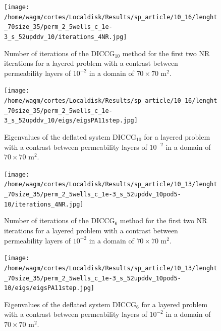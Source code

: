 \documentclass[12pt]{article}
\begin{document}
\begin{figure}[!h]
\centering
\begin{minipage}{.4\textwidth}
\vspace{-0.4cm}
\hspace{-1cm}
\texttt{[image: /home/wagm/cortes/Localdisk/Results/sp\_article/10\_16/lenght\_70size\_35/perm\_2\_5wells\_c\_1e-3\_s\_52upddv\_10/iterations\_4NR.jpg]}
\vspace{-1.3cm}
\caption{Number of iterations of the DICCG$_{10}$ method for the first two NR iterations for a layered problem with a contrast between permeability layers of $10^{-2}$ in a domain of $70 \times 70$ m$^2$.}
\label{fig:NR_D10_2}
\end{minipage}%
\hspace{15mm}
\begin{minipage}{.4\textwidth}
 \centering
\texttt{[image: /home/wagm/cortes/Localdisk/Results/sp\_article/10\_16/lenght\_70size\_35/perm\_2\_5wells\_c\_1e-3\_s\_52upddv\_10/eigs/eigsPA11step.jpg]}
\caption{Eigenvalues of the deflated system DICCG$_{10}$ for a layered problem with a contrast between permeability layers of $10^{-2}$ in a domain of $70 \times 70$ m$^2$.}
\label{fig:eigs_PA10_2}
\end{minipage}
\end{figure}


\begin{figure}[!h]
\centering
\begin{minipage}{.4\textwidth}
\vspace{-0.4cm}
\hspace{-1cm}
\texttt{[image: /home/wagm/cortes/Localdisk/Results/sp\_article/10\_13/lenght\_70size\_35/perm\_2\_5wells\_c\_1e-3\_s\_52upddv\_10pod5-10/iterations\_4NR.jpg]}
\vspace{-1.3cm}
\caption{Number of iterations of the DICCG$_6$ method for the first two NR iterations for a layered problem with a contrast between permeability layers of $10^{-2}$ in a domain of $70 \times 70$ m$^2$.}
\label{fig:NR_D6_2}
\end{minipage}%
\hspace{15mm}
\begin{minipage}{.4\textwidth}
 \centering
\texttt{[image: /home/wagm/cortes/Localdisk/Results/sp\_article/10\_13/lenght\_70size\_35/perm\_2\_5wells\_c\_1e-3\_s\_52upddv\_10pod5-10/eigs/eigsPA11step.jpg]}
\caption{Eigenvalues of the deflated system DICCG$_6$ for a layered problem with a contrast between permeability layers of $10^{-2}$ in a domain of $70 \times 70$ m$^2$.}
\label{fig:eigs_PA6_2}
\end{minipage}
\end{figure}
\end{document}
